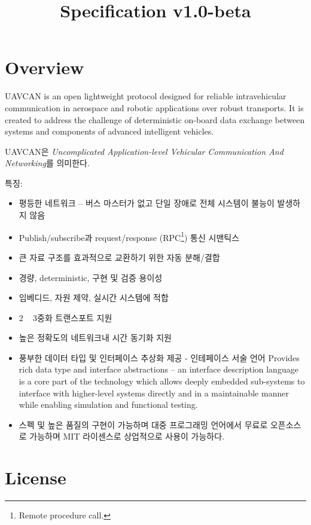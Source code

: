 \documentclass{uavcandoc}
\title{Specification v1.0-beta}
\begin{document}
\frontmatter

\begin{titlepage}

\section*{Overview}

UAVCAN is an open lightweight protocol designed for reliable intravehicular communication
in aerospace and robotic applications over robust transports.
It is created to address the challenge of deterministic on-board data exchange
between systems and components of advanced intelligent vehicles.

UAVCAN은 \emph{Uncomplicated Application-level Vehicular Communication And Networking}를 의미한다.

특징:

\begin{itemize}
    \item 평등한 네트워크 -- 버스 마스터가 없고 단일 장애로 전체 시스템이 불능이 발생하지 않음
    \item Publish/subscribe과 request/response (RPC\footnote{Remote procedure call.}) 통신 시맨틱스
    \item 큰 자료 구조를 효과적으로 교환하기 위한 자동 분해/결합
    \item 경량, deterministic, 구현 및 검증 용이성
    \item 임베디드, 자원 제약, 실시간 시스템에 적합
    \item 2 ~ 3중화 트랜스포트 지원
    \item 높은 정확도의 네트워크내 시간 동기화 지원
    \item 풍부한 데이터 타입 및 인터페이스 추상화 제공 - 인테페이스 서술 언어 Provides rich data type and interface abstractions -- an interface description language is a core part of
    the technology which allows deeply embedded sub-systems to interface with higher-level systems directly and
    in a maintainable manner while enabling simulation and functional testing.
    \item 스펙 및 높은 품질의 구현이 가능하며 대중 프로그래밍 언어에서 무료로 오픈소스로 가능하며 MIT 라이센스로 상업적으로 사용이 가능하다.
\end{itemize}

\BeginRightColumn

\section*{License}


\end{titlepage}
\end{document}
